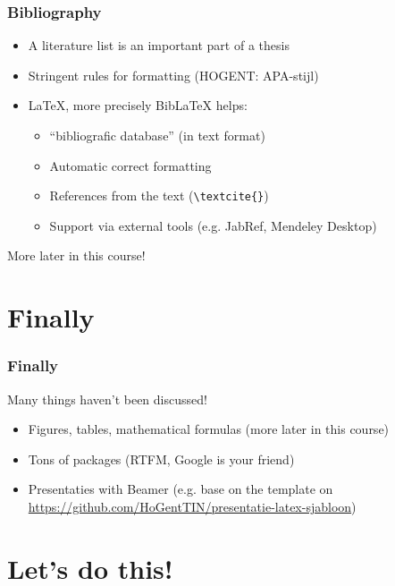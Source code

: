\documentclass[aspectratio=169]{beamer}
\begin{document}
\begin{frame}[fragile]
  \frametitle{Bibliography}

  \begin{itemize}
    \item<+-> A literature list is an important part of a thesis
    \item<+-> Stringent rules for formatting (HOGENT: APA-stijl)
    \item<+-> {\LaTeX}, more precisely Bib{\LaTeX} helps:
    \begin{itemize}
      \item<+-> ``bibliografic database'' (in text format)
      \item<+-> Automatic correct formatting
      \item<+-> References from the text (\verb|\textcite{}|)
      \item<+-> Support via external tools (e.g. JabRef, Mendeley Desktop)
    \end{itemize}
  \end{itemize}

  \pause More later in this course!
\end{frame}

\section{Finally}

\begin{frame}[fragile]
 \frametitle{Finally}

  Many things haven't been discussed!

  \begin{itemize}
    \item<+-> Figures, tables, mathematical formulas (more later in this course)
    \item<+-> Tons of packages (RTFM, Google is your friend)
    \item<+-> Presentaties with Beamer (e.g. base on the template on \url{https://github.com/HoGentTIN/presentatie-latex-sjabloon})

  \end{itemize}
\end{frame}

\section{Let's do this!}
\end{document}
